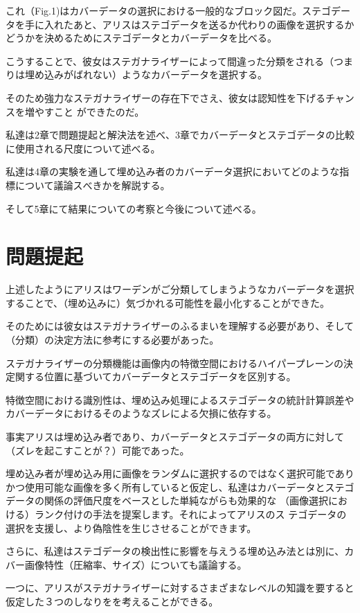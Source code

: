 \documentclass[a4j,fleqn,10pt]{jsarticle}
\begin{document}
これ（Fig.1)はカバーデータの選択における一般的なブロック図だ。ステゴデー
タを手に入れたあと、アリスはステゴデータを送るか代わりの画像を選択するか
どうかを決めるためにステゴデータとカバーデータを比べる。

こうすることで、彼女はステガナライザーによって間違った分類をされる（つま
りは埋め込みがばれない）ようなカバーデータを選択する。

そのため強力なステガナライザーの存在下でさえ、彼女は認知性を下げるチャンスを増やすこと
ができたのだ。

私達は2章で問題提起と解決法を述べ、3章でカバーデータとステゴデータの比較
に使用される尺度について述べる。

私達は4章の実験を通して埋め込み者のカバーデータ選択においてどのような指
標について議論スべきかを解説する。

そして5章にて結果についての考察と今後について述べる。

\section{問題提起}
上述したようにアリスはワーデンがご分類してしまうようなカバーデータを選択
することで、（埋め込みに）気づかれる可能性を最小化することができた。

そのためには彼女はステガナライザーのふるまいを理解する必要があり、そして
（分類）の決定方法に参考にする必要があった。

ステガナライザーの分類機能は画像内の特徴空間におけるハイパープレーンの決
定関する位置に基づいてカバーデータとステゴデータを区別する。

特徴空間における識別性は、埋め込み処理によるステゴデータの統計計算誤差や
カバーデータにおけるそのようなズレによる欠損に依存する。

事実アリスは埋め込み者であり、カバーデータとステゴデータの両方に対して
（ズレを起こすことが？）可能であった。

埋め込み者が埋め込み用に画像をランダムに選択するのではなく選択可能であり
かつ使用可能な画像を多く所有していると仮定し、私達はカバーデータとステゴ
データの関係の評価尺度をベースとした単純ながらも効果的な
（画像選択における）ランク付けの手法を提案します。それによってアリスのス
テゴデータの選択を支援し、より偽陰性を生じさせることができます。

さらに、私達はステゴデータの検出性に影響を与えうる埋め込み法とは別に、カ
バー画像特性（圧縮率、サイズ）についても議論する。

一つに、アリスがステガナライザーに対するさまざまなレベルの知識を要すると
仮定した３つのしなりをを考えることができる。
\end{document}
